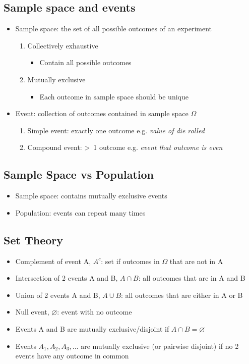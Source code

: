 \documentclass[a4paper]{article}
\begin{document}
\subsection{Sample space and events}
\begin{itemize}
    \item Sample space: the set of all possible outcomes of an experiment
    \begin{enumerate}
        \item Collectively exhaustive
        \begin{itemize}[label=$\circ$]
            \item Contain all possible outcomes
        \end{itemize}
        \item Mutually exclusive
        \begin{itemize}[label=$\circ$]
            \item Each outcome in sample space should be unique
        \end{itemize}
    \end{enumerate}
    \item Event: collection of outcomes contained in sample space $\Omega$
    \begin{enumerate}
        \item Simple event: exactly one outcome e.g. \textit{value of die rolled}
        \item Compound event: \textgreater \ 1 outcome e.g. \textit{event that outcome is even}
    \end{enumerate}
\end{itemize}
\subsection{Sample Space vs Population}
\begin{itemize}
    \item Sample space: contains mutually exclusive events
    \item Population: events can repeat many times
\end{itemize}
\subsection{Set Theory}
\begin{itemize}
    \item Complement of event A, $A^c$: set if outcomes in $\Omega$ that are not in A
    \item Intersection of 2 events A and B, $A\cap B$: all outcomes that are in A and B
    \item Union of 2 events A and B, $A\cup B$: all outcomes that are either in A or B
    \item Null event, $\varnothing$: event with no outcome
    \newline
    \item Events A and B are mutually exclusive/disjoint if $A\cap B = \varnothing$
    \item Events $A_{1}, A_{2}, A_{3}, \ldots$ are mutually exclusive (or pairwise disjoint) if no 2 events have any outcome in common
\end{itemize}
\end{document}
